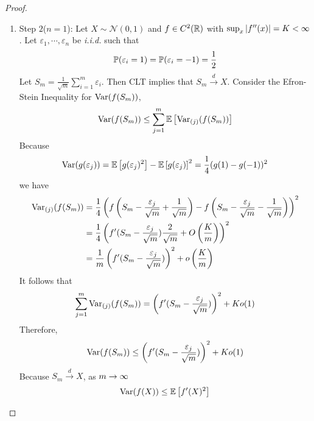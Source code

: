 \begin{enumerate}[label=\arabic{*}.]
\begin{proof}
\begin{enumerate}[label=\Roman{*}.]
	    	\item Step $2$($n=1$): Let $X \sim \mathcal{N}(0,1)$ and $f \in C^2(\mathbb{R})$ with $\sup_x \left\lvert f^{\prime\prime}(x)\right\lvert = K < \infty$. Let $\varepsilon_1,\cdots,\varepsilon_n$ be \emph{i.i.d.} such that
	    	\begin{equation*}
	    	    \mathbb{P}(\varepsilon_i = 1) = \mathbb{P}(\varepsilon_i = -1) = \frac{1}{2}
	    	\end{equation*}
	    	Let $S_m = \frac{1}{\sqrt{m}}\sum_{i=1}^m\varepsilon_i$. Then CLT implies that $S_m  \xrightarrow{d} X$. Consider the Efron-Stein Inequality for $\operatorname{Var}(f(S_m))$,
	    	\begin{equation*}
	    	    \operatorname{Var}(f(S_m)) \leq \sum_{j=1}^m\mathbb{E}\left[\operatorname{Var}_{(j)}(f(S_m))\right]
	    	\end{equation*}
	    	Because
	    	\begin{equation*}
	    	    \operatorname{Var}(g(\varepsilon_j)) = \mathbb{E}\left[g(\varepsilon_j)^2\right] - \mathbb{E}\left[g(\varepsilon_j)\right]^2 = \frac{1}{4}(g(1)-g(-1))^2
	    	\end{equation*}
	    	we have
	    	\begin{equation*}
	    	    \begin{aligned}
	    	    	\operatorname{Var}_{(j)}(f(S_m)) &= \frac{1}{4}\left(f\left(S_m - \frac{\varepsilon_j}{\sqrt{m}} + \frac{1}{\sqrt{m}}\right) - f\left(S_m - \frac{\varepsilon_j}{\sqrt{m}} - \frac{1}{\sqrt{m}}\right)\right)^2 \\
	    	    	&= \frac{1}{4}\left(f^\prime(S_m - \frac{\varepsilon_j}{\sqrt{m}})\frac{2}{\sqrt{m}} + O\left(\frac{K}{m}\right)\right)^2 \\
	    	    	&= \frac{1}{m}\left(f^\prime(S_m - \frac{\varepsilon_j}{\sqrt{m}})\right)^2 + o\left(\frac{K}{m}\right)
	    	    \end{aligned}
	    	\end{equation*}
	    	It follows that
	    	\begin{equation*}
	    	    \sum_{j=1}^m \operatorname{Var}_{(j)}(f(S_m)) = \left(f^\prime(S_m - \frac{\varepsilon_j}{\sqrt{m}})\right)^2 + Ko(1)
	    	\end{equation*}
	    	Therefore,
	    	\begin{equation*}
	    	    \operatorname{Var}(f(S_m)) \leq \left(f^\prime(S_m - \frac{\varepsilon_j}{\sqrt{m}})\right)^2 + Ko(1)
	    	\end{equation*}
	    	Because $S_m  \xrightarrow{d} X$, as $m \rightarrow \infty$
	    	\begin{equation*}
	    	    \operatorname{Var}(f(X)) \leq  \mathbb{E}\left[f^\prime(X)^2\right] \qedhere
	    	\end{equation*}
	    \end{enumerate}
	\end{proof}

\end{enumerate}

